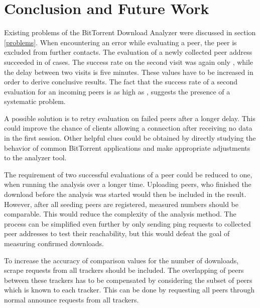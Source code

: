 \documentclass[10pt, a4paper, twoside=false, headsepline]{scrbook}
\renewcommand{\_}{\origunderscore\allowbreak}
\begin{document}
\chapter{Conclusion and Future Work}
\label{conc}
Existing problems of the BitTorrent Download Analyzer were discussed in section \ref{problems}. When encountering an error while evaluating a peer, the peer is excluded from further contacts. The evaluation of a newly collected peer address succeeded in  of cases. The success rate on the second visit was again only , while the delay between two visits is five minutes. These values have to be increased in order to derive conclusive results. The fact that the success rate of a second evaluation for an incoming peers is as high as , suggests the presence of a systematic problem.

A possible solution is to retry evaluation on failed peers after a longer delay. This could improve the chance of clients allowing a connection after receiving no data in the first session. Other helpful clues could be obtained by directly studying the behavior of common BitTorrent applications and make appropriate adjustments to the analyzer tool.

The requirement of two successful evaluations of a peer could be reduced to one, when running the analysis over a longer time. Uploading peers, who finished the download before the analysis was started would then be included in the result. However, after all seeding peers are registered, measured numbers should be comparable. This would reduce the complexity of the analysis method.
The process can be simplified even further by only sending ping requests to collected peer addresses to test their reachability, but this would defeat the goal of measuring confirmed downloads.

To increase the accuracy of comparison values for the number of downloads, scrape requests from all trackers should be included. The overlapping of peers between these trackers has to be compensated by considering the subset of peers which is known to each tracker. This can be done by requesting all peers through normal announce requests from all trackers.

\setcounter{biburllcpenalty}{7000}
\setcounter{biburlucpenalty}{8000}
\printbibheading[heading=bibintoc]
\begingroup
\setlength{}
\printbibliography[heading=subbibintoc, title={Literature}, keyword=science]
\printbibliography[heading=subbibintoc, title={Software}, keyword=software]
\printbibliography[heading=subbibintoc, title={Online}, keyword=online]
\printbibliography[heading=subbibintoc, title={Other}, notkeyword=science, notkeyword=standard, notkeyword=software, notkeyword=online] %
\endgroup
\printbibliography[heading=subbibintoc, title={Standards}, keyword=standard]
\end{document}
